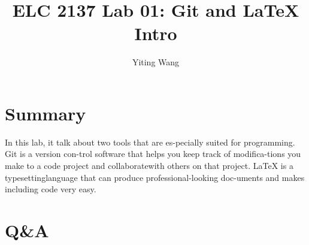 \documentclass[11pt]{article}
\begin{document}
\title{ELC 2137 Lab 01: Git and LaTeX Intro}
\author{Yiting Wang}

\maketitle


\section*{Summary}

	In this lab, it talk about two tools that are es-pecially suited for programming.  Git is a version con-trol software that helps you keep track of modifica-tions you make to a code project and collaboratewith others on that project.  LaTeX is a typesettinglanguage that can produce professional-looking doc-uments and makes including code very easy.



\section*{Q\&A}
\end{document}
